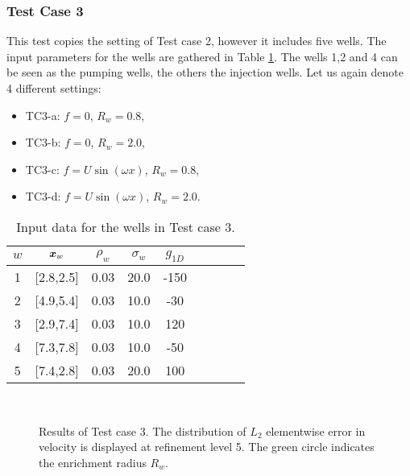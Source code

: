 


\subsubsection{Test Case 3}
This test copies the setting of Test case 2, however it includes five wells.
The input parameters for the wells are gathered in Table \ref{tab:tc3_data}.
The wells 1,2 and 4 can be seen as the pumping wells, the others the injection wells.
Let us again denote 4 different settings:
\begin{itemize}
    \item TC3-a: $f=0$, $R_w=0.8$,
    \item TC3-b: $f=0$, $R_w=2.0$,
    \item TC3-c: $f=U\sin(\omega x)$, $R_w=0.8$,
    \item TC3-d: $f=U\sin(\omega x)$, $R_w=2.0$.
\end{itemize}
%
\begin{table}[!htb]
\begin{center}
\begin{tabular}{ccccccccc}
\toprule
$w$ & $\mathbf{\boldsymbol{x}}_w$  & $\rho_w$ & $\sigma_w$ & $g_{1D}$\\
\midrule
1& [2.8,2.5] & 0.03 & 20.0 & -150 \\
2& [4.9,5.4] & 0.03 & 10.0 & -30 \\
3& [2.9,7.4] & 0.03 & 10.0 & 120 \\
4& [7.3,7.8] & 0.03 & 10.0 & -50 \\
5& [7.4,2.8] & 0.03 & 20.0 & 100 \\
\bottomrule
\end{tabular}
\caption{Input data for the wells in Test case 3.}
\label{tab:tc3_data}
\end{center}
\end{table}
%
\begin{figure}[!htb]
    \centering
     \\
    \caption[Error distribution in Test case 3.]
    {Results of Test case 3. The distribution of $L_2$ elementwise error in velocity is displayed at refinement level 5.
    The green circle indicates the enrichment radius $R_w$. }
    \label{fig:mh_tc3_error}
\end{figure}
